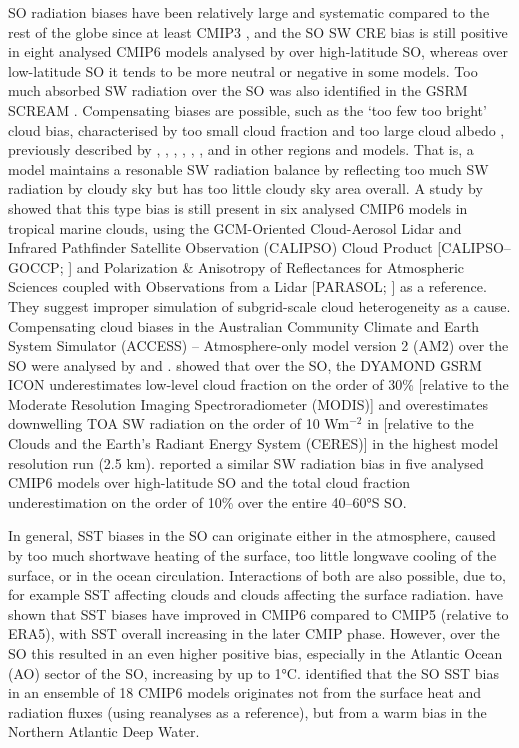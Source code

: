 \documentclass[12pt,a4paper]{article}
\begin{document}
SO radiation biases have been relatively large and systematic compared to the
rest of the globe since at least CMIP3 \citep{trenberth2010}, and the SO SW CRE
bias is still positive in eight analysed CMIP6 models analysed by
\cite{schuddeboom2021} over high-latitude SO, whereas over low-latitude SO it
tends to be more neutral or negative in some models. Too much absorbed SW
radiation over the SO was also identified in the GSRM SCREAM
\cite{caldwell2021}. Compensating biases are possible, such as the `too few too
bright' cloud bias, characterised by too small cloud fraction and too large
cloud albedo \citep{wall2017,kuma2020}, previously described by
\cite{webb2001}, \cite{weare2004}, \cite{zhang2005}, \cite{karlsson2008},
\cite{nam2012}, \cite{klein2013}, and \cite{bender2017} in other regions and
models. That is, a model maintains a resonable SW radiation balance by
reflecting too much SW radiation by cloudy sky but has too little cloudy sky
area overall. A study by \cite{konsta2022} showed that this type bias is still
present in six analysed CMIP6 models in tropical marine clouds, using the
GCM-Oriented Cloud-Aerosol Lidar and Infrared Pathfinder Satellite Observation
(CALIPSO) Cloud Product [CALIPSO--GOCCP; \cite{chepfer2010}] and Polarization
\& Anisotropy of Reflectances for Atmospheric Sciences coupled with
Observations from a Lidar [PARASOL; \citep{lier2008}] as a reference. They
suggest improper simulation of subgrid-scale cloud heterogeneity as a cause.
Compensating cloud biases in the Australian Community Climate and Earth System
Simulator (ACCESS) – Atmosphere-only model version 2 (AM2) over the SO were
analysed by \cite{fiddes2022} and \cite{fiddes2024}.  \cite{possner2022} showed
that over the SO, the DYAMOND GSRM ICON underestimates low-level cloud fraction
on the order of 30\% [relative to the Moderate Resolution Imaging
Spectroradiometer (MODIS)] and overestimates downwelling TOA SW radiation on
the order of 10 Wm$^\mathrm{-2}$ in  [relative to the Clouds and the Earth’s
Radiant Energy System (CERES)] in the highest model resolution run (2.5 km).
\cite{zhao2022} reported a similar SW radiation bias in five analysed CMIP6
models over high-latitude SO and the total cloud fraction underestimation on
the order of 10\% over the entire 40--60°S SO.

In general, SST biases in the SO can originate either in the atmosphere, caused
by too much shortwave heating of the surface, too little longwave cooling of
the surface, or in the ocean circulation.  Interactions of both are also
possible, due to, for example SST affecting clouds and clouds affecting the
surface radiation.  \cite{zhang2023} have shown that SST biases have improved
in CMIP6 compared to CMIP5 (relative to ERA5), with SST overall increasing in
the later CMIP phase. However, over the SO this resulted in an even higher
positive bias, especially in the Atlantic Ocean (AO) sector of the SO,
increasing by up to 1°C.  \cite{luo2023} identified that the SO SST bias in an
ensemble of 18 CMIP6 models originates not from the surface heat and radiation
fluxes (using reanalyses as a reference), but from a warm bias in the Northern
Atlantic Deep Water.
\end{document}
